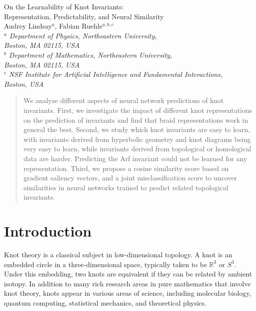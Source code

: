 \documentclass[11pt]{article}
\numberwithin{equation}{section}
\begin{document}
\pagestyle{empty}      
\begin{center}
\null\vskip0.2in
{\LARGE On the Learnability of Knot Invariants:\\ Representation, Predictability, and Neural Similarity\\[0.5in]}
%
{Audrey Lindsay$^{a}$, Fabian Ruehle$^{a,b,c}$\\[0.2in]}
{\it 
$^a$ Department of Physics, Northeastern University,\\
Boston, MA 02115, USA\\[3ex]
%
$^b$ Department of Mathematics, Northeastern University,\\
Boston, MA 02115, USA\\[3ex]
%
$^c$ NSF Institute for Artificial Intelligence and Fundamental Interactions,\\
Boston, USA
}
\end{center}
\vspace{1cm}
\begin{abstract}
We analyze different aspects of neural network predictions of knot invariants. First, we investigate the impact of different knot representations on the prediction of invariants and find that braid representations work in general the best. Second, we study which knot invariants are easy to learn, with invariants derived from hyperbolic geometry and knot diagrams being very easy to learn, while invariants derived from topological or homological data are harder. Predicting the Arf invariant could not be learned for any representation. Third, we propose a cosine similarity score based on gradient saliency vectors, and a joint misclassification score to uncover similarities in neural networks trained to predict related topological invariants.
\end{abstract}

\clearpage
\pagestyle{empty}
\tableofcontents

\setcounter{page}{1}
\pagestyle{plain}

\section{Introduction} 
\label{sec:Introduction}
Knot theory is a classical subject in low-dimensional topology. A knot is an embedded circle in a three-dimensional space, typically taken to be $\mathbb{R}^3$ or $S^3$. Under this embedding, two knots are equivalent if they can be related by ambient isotopy. In addition to many rich research areas in pure mathematics that involve knot theory, knots appear in various areas of science, including molecular biology, quantum computing, statistical mechanics, and theoretical physics.
\end{document}
